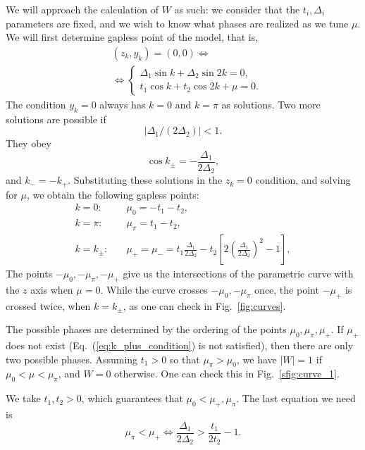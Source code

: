 \documentclass[a4paper]{article}
\begin{document}
We will approach the calculation of $W$ as such: we consider that the $t_i,\Delta_i$ parameters are fixed, and we wish to know what phases are realized as we tune $\mu$. We will first determine gapless point of the model, that is,
\begin{align}
	&(z_k,y_k) = (0,0) \Leftrightarrow \\
	&\Leftrightarrow\begin{cases}
		\Delta_1 \sin{k} + \Delta_2 \sin{2k} = 0,\\
		t_1 \cos{k} + t_2 \cos{2k} + \mu = 0.
	\end{cases}
\end{align}
The condition $y_k = 0$ always has $k=0$ and $k=\pi$ as solutions. Two more solutions are possible if
\begin{equation}
	\left|\Delta_1/(2\Delta_2)\right| < 1.
	\label{eq:k_plus_condition}
\end{equation}
They obey
\begin{equation}
	\cos{k_{\pm}} = -\frac{\Delta_1}{2\Delta_2},
\end{equation}
and $k_{-} = - k_{+}$. Substituting these solutions in the $z_k = 0$ condition, and solving for $\mu$, we obtain the following gapless points:
\begin{align}
	k = 0:\quad &\mu_0 = - t_1 - t_2, \\
	k = \pi:\quad &\mu_{\pi} = t_1 - t_2, \\
	k = k_{\pm}:\quad &\mu_{+} = \mu_{-} = t_1\frac{\Delta_1}{2\Delta_2} - t_2 \left[ 2\left(\frac{\Delta_1}{2\Delta_2}\right)^2 - 1 \right],
\end{align}
The points $-\mu_0,-\mu_{\pi},-\mu_{+}$ give us the intersections of the parametric curve with the $z$ axis when $\mu = 0$. While the curve crosses $-\mu_0,-\mu_{\pi}$ once, the point $-\mu_{+}$ is crossed twice, when $k=k_{\pm}$, as one can check in Fig.~\ref{fig:curves}.

The possible phases are determined by the ordering of the points $\mu_0,\mu_{\pi},\mu_{+}$. If $\mu_{+}$ does not exist (Eq.~(\ref{eq:k_plus_condition}) is not satisfied), then there are only two possible phases. Assuming $t_1 > 0$ so that $\mu_{\pi} > \mu_{0}$, we have $|W| = 1$ if $\mu_{0}<\mu<\mu_{\pi}$, and $W = 0$ otherwise. One can check this in Fig.~\ref{sfig:curve_1}.

We take $t_1,t_2>0$, which guarantees that $\mu_0 < \mu_+,\mu_{\pi}$. The last equation we need is
\begin{equation}
	\mu_{\pi} < \mu_{+} \Leftrightarrow \frac{\Delta_1}{2\Delta_2} > \frac{t_1}{2t_2} - 1.
\end{equation}
\end{document}
